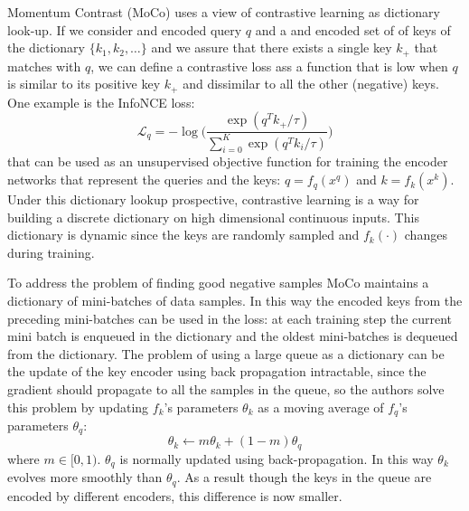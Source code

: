 Momentum Contrast (MoCo) \cite{he2020momentum} uses a view of contrastive learning as dictionary look-up. If we consider and encoded query $q$ and a and encoded set of of keys of the dictionary $\{k_1, k_2, \dots\}$ and we assure that there exists a single key $k_+$ that matches with $q$, we can define a contrastive loss ass a function that is low when $q$ is similar to its positive key $k_+$ and dissimilar to all the other (negative) keys. One example is the InfoNCE loss: 
\[ \mathcal{L}_q = - \log\Bigg( \frac{\exp(q^Tk_+/\tau)}{\sum_{i=0}^K \exp(q^T k_i/\tau)}\Bigg)\]
that can be used as an unsupervised objective function for training the encoder networks that represent the queries and the keys: $q = f_q(x^q)$ and $k = f_k(x^k)$. Under this dictionary lookup prospective, contrastive learning is a way for building a discrete dictionary on high dimensional continuous inputs. This dictionary is dynamic since the keys are randomly sampled and $f_k(\cdot)$ changes during training. 

To address the problem of finding good negative samples MoCo maintains a dictionary of mini-batches of data samples. In this way the encoded keys from the preceding mini-batches can be used in the loss: at each training step the current mini batch is enqueued in the dictionary and the oldest mini-batches is dequeued from the dictionary. The problem of using a large queue as a dictionary can be the update of the key encoder using back propagation intractable, since the gradient should propagate to all the samples in the queue, so the authors solve this problem by updating $f_k$'s parameters $\theta_k$ as a moving average of $f_q$'s parameters $\theta_q$:
\[\theta_k \leftarrow m\theta_k + (1-m)\theta_q \]
where $m \in [0,1)$. $\theta_q$ is normally updated using back-propagation. In this way $\theta_k$ evolves more smoothly than $\theta_q$. As a result though the keys in the queue are encoded by different encoders, this difference is now smaller.
